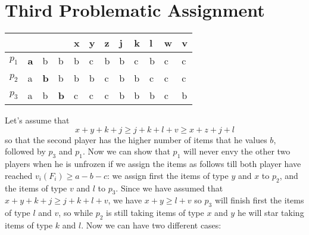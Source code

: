 \section{Third Problematic Assignment}

\begin{table}[h]
\centering
\begin{tabular}{|l|l|l|l||l|l|l|l|l|l|l|l|}
\hline
      &                 &               &               & x & y & z & j & k & l & w & v \\ \hline
$p_1$ & \textbf{a}     & b             & b             & b & c & b & b & c & b & c & c \\ \hline
$p_2$ & a               & \textbf{b}    & b             & b & b & c & b & b & c & c & c \\ \hline
$p_3$ & a               & b             & \textbf{b}    & c & c & c & b & b & b & c & b \\ \hline
\end{tabular}
\end{table}
Let's assume that 
$$x + y + k + j \ge j + k + l + v \ge x + z + j + l$$
so that the second player has the higher number of items that he values $b$, followed by $p_3$ and $p_1$. Now we can show that $p_1$ will never envy the other two players when he is unfrozen if we assign the items as follows till both player have reached $v_i(F_i) \ge a-b-c$: we assign first the items of type $y$ and $x$ to $p_2$, and the items of type $v$ and $l$ to $p_3$. Since we have assumed that $x + y + k + j \ge j + k + l + v $, we have $x + y  \ge  l + v $ so $p_3$ will finish first the items of type $l$ and $v$, so while $p_2$ is still taking items of type $x$ and $y$ he will star taking items of type $k$ and $l$. Now we can have two different cases:
